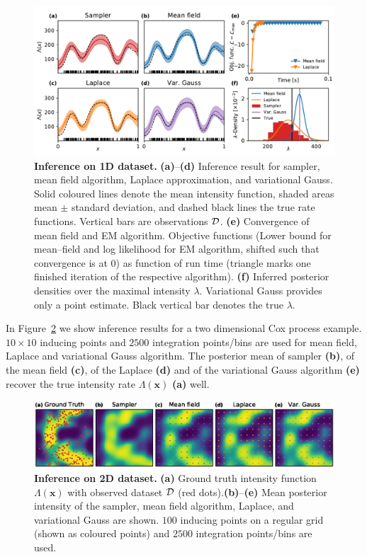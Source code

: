 \documentclass[twoside,11pt]{article}
\newcommand{\dataset}{{\cal D}}
\newcommand{\bx}{\boldsymbol{x}}
\begin{document}
\begin{figure}
\centering
\includegraphics[width=.9\textwidth]{figures/fig1.pdf}
\caption{{\bf Inference on 1D dataset.} {\bf (a)}--{\bf (d)} Inference result for sampler, mean field algorithm, Laplace approximation, and variational Gauss. Solid coloured lines denote the mean intensity function, shaded areas mean $\pm$ standard deviation, and dashed black lines the true rate functions. Vertical bars are observations $\dataset$. {\bf (e)} Convergence of mean field and EM algorithm. Objective functions (Lower bound for mean--field and log likelihood for EM algorithm, shifted such that convergence is at $0$) as function of run time (triangle marks one finished iteration of the respective algorithm). {\bf (f)} Inferred posterior densities over the maximal intensity $\lambda$. Variational Gauss provides only a point estimate. Black vertical bar denotes the true $\lambda$.}
\label{fig:fig1}
\end{figure}

In Figure~\ref{fig:fig2} we show inference results for a two dimensional Cox process example. $10\times10$ inducing points and $2500$ integration points/bins are used for mean field, Laplace and variational Gauss algorithm. The posterior mean of sampler {\bf (b)}, of the mean field {\bf (c)}, of the Laplace {\bf (d)} and of the variational Gauss algorithm {\bf (e)} recover the true intensity rate $\Lambda(\bx)$ {\bf (a)} well.

\begin{figure}
\centering
\includegraphics[width=.9\textwidth]{figures/fig2.eps}
\caption{{\bf Inference on 2D dataset.} {\bf (a)} Ground truth intensity function $\Lambda(\bx)$ with observed dataset $\dataset$ (red dots).{\bf (b)}--{\bf (e)} Mean posterior intensity of the sampler, mean field algorithm, Laplace, and variational Gauss are shown. $100$ inducing points on a regular grid (shown as coloured points) and $2500$ integration points/bins are used.}
\label{fig:fig2}
\end{figure}
\end{document}

